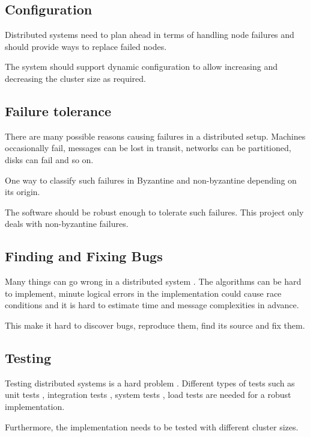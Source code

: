 \subsection{Configuration}

Distributed systems need to plan ahead in terms of handling node failures and
should provide ways to replace failed nodes. 

The system should support dynamic configuration to allow increasing and
decreasing the cluster size as required.

\subsection{Failure tolerance}

There are many possible reasons causing failures in a distributed setup. 
Machines occasionally fail, messages can be lost in transit, networks can be
partitioned, disks can fail and so on.

One way to classify such failures in Byzantine%
and non-byzantine%
depending on its origin.

The software should be robust enough to tolerate such failures. This project 
only deals with non-byzantine failures.

\subsection{Finding and Fixing Bugs}

Many things can go wrong in a distributed system 
\citep{Rotem-gal-oz_fallaciesof}. The algorithms can be hard to implement, 
minute logical errors in the implementation could cause race conditions and
it is hard to estimate time and message complexities in advance.

This make it hard to discover bugs, reproduce them, find its source and fix
them.

\subsection{Testing}

Testing distributed systems is a hard problem \citep{BoyCPW2003}.
Different types of tests such as unit tests%
, integration tests%
, system tests%
, load tests%
are needed for a robust implementation.

Furthermore, the implementation needs to be tested with different cluster sizes. 

